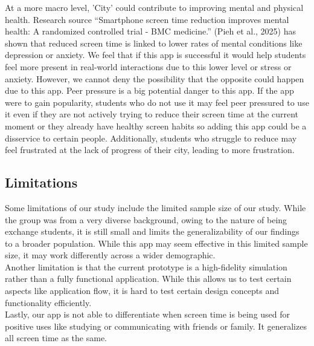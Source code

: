 \documentclass[sigconf, 11pt]{acmart}
\begin{document}
At a more macro level, 'City' could contribute to improving mental and physical health. Research source “Smartphone screen time reduction improves mental health: A randomized controlled trial - BMC medicine.” (Pieh et al., 2025) has shown that reduced screen time is linked to lower rates of mental conditions like depression or anxiety. We feel that if this app is successful it would help students feel more present in real-world interactions due to this lower level or stress or anxiety. However, we cannot deny the possibility that the opposite could happen due to this app. Peer pressure is a big potential danger to this app. If the app were to gain popularity, students who do not use it may feel peer pressured to use it even if they are not actively trying to reduce their screen time at the current moment or they already have healthy screen habits so adding this app could be a disservice to certain people. Additionally, students who struggle to reduce may feel frustrated at the lack of progress of their city, leading to more frustration.  


\subsection{Limitations}
Some limitations of our study include the limited sample size of our study. While the group was from a very diverse background, owing to the nature of being exchange students, it is still small and limits the generalizability of our findings to a broader population. While this app may seem effective in this limited sample size, it may work differently across a wider demographic.
\\

Another limitation is that the current prototype is a high-fidelity simulation rather than a fully functional application. While this allows us to test certain aspects like application flow, it is hard to test certain design concepts and functionality efficiently. 
\\

Lastly, our app is not able to differentiate when screen time is being used for positive uses like studying or communicating with friends or family. It generalizes all screen time as the same. 
\end{document}
